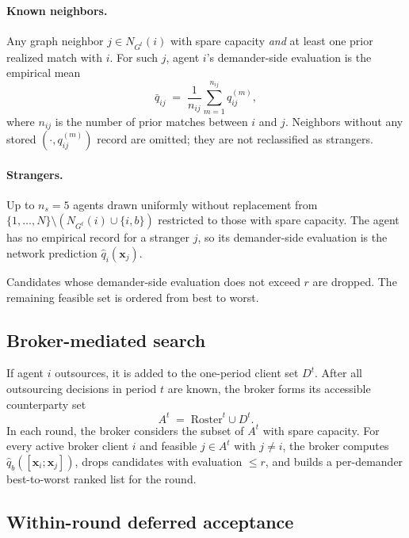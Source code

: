 \documentclass[11pt]{article}
\newcommand{\x}{\mathbf{x}}
\newcommand{\Roster}{\mathrm{Roster}}
\newcommand{\qhat}{\hat{q}}
\newcommand{\Ntot}{N}
\begin{document}
\paragraph{Known neighbors.} Any graph neighbor $j\in N_{G^t}(i)$ with spare capacity \emph{and} at least one prior realized match with $i$. For such $j$, agent $i$'s demander-side evaluation is the empirical mean
\begin{equation}
\bar q_{ij} \;=\; \frac{1}{n_{ij}}\sum_{m=1}^{n_{ij}} q_{ij}^{(m)},
\label{eq:partner-mean}
\end{equation}
where $n_{ij}$ is the number of prior matches between $i$ and $j$. Neighbors without any stored $(\cdot,q_{ij}^{(m)})$ record are omitted; they are not reclassified as strangers.

\paragraph{Strangers.} Up to $n_s=5$ agents drawn uniformly without replacement from $\{1,\ldots,\Ntot\}\setminus (N_{G^t}(i)\cup\{i,b\})$ restricted to those with spare capacity. The agent has no empirical record for a stranger $j$, so its demander-side evaluation is the network prediction $\qhat_i(\x_j)$.

Candidates whose demander-side evaluation does not exceed $r$ are dropped. The remaining feasible set is ordered from best to worst.

\subsection{Broker-mediated search}\label{sec:brokersearch}

If agent $i$ outsources, it is added to the one-period client set $D^t$. After all outsourcing decisions in period $t$ are known, the broker forms its accessible counterparty set
\begin{equation}
A^t \;=\; \Roster^t \cup D^t.
\label{eq:At}
\end{equation}
In each round, the broker considers the subset of $A^t$ with spare capacity. For every active broker client $i$ and feasible $j\in A^t$ with $j\neq i$, the broker computes $\qhat_b([\x_i;\x_j])$, drops candidates with evaluation $\le r$, and builds a per-demander best-to-worst ranked list for the round.

\subsection{Within-round deferred acceptance}\label{sec:da}
\end{document}
